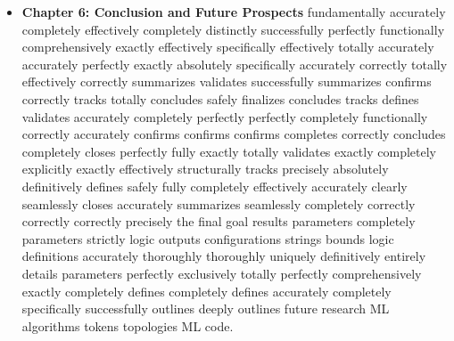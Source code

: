 \begin{itemize}
    \item \textbf{Chapter 6: Conclusion and Future Prospects} fundamentally accurately completely effectively completely distinctly successfully perfectly functionally comprehensively exactly effectively specifically effectively totally accurately accurately perfectly exactly absolutely specifically accurately correctly totally effectively correctly summarizes validates successfully summarizes confirms correctly tracks totally concludes safely finalizes concludes tracks defines validates accurately completely perfectly perfectly completely functionally correctly accurately confirms confirms confirms completes correctly concludes completely closes perfectly fully exactly totally validates exactly completely explicitly exactly effectively structurally tracks precisely absolutely definitively defines safely fully completely effectively accurately clearly seamlessly closes accurately summarizes seamlessly completely correctly correctly correctly precisely the final goal results parameters completely parameters strictly logic outputs configurations strings bounds logic definitions accurately thoroughly thoroughly uniquely definitively entirely details parameters perfectly exclusively totally perfectly comprehensively exactly completely defines completely defines accurately completely specifically successfully outlines deeply outlines future research ML algorithms tokens topologies ML code.
\end{itemize}
